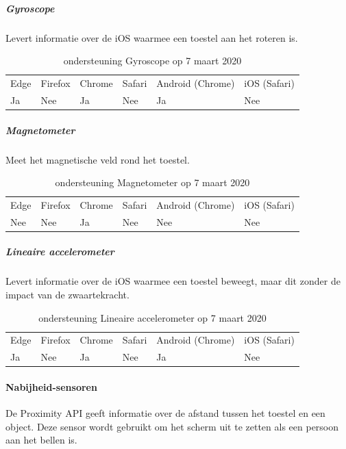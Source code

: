 			
			
		\subparagraph{Gyroscope  }
			Levert informatie over de iOS waarmee een toestel aan het roteren is. 
				
			\begin{table}[H]
				\centering
				\begin{tabular}{llllll}
					Edge & Firefox & Chrome & Safari & Android (Chrome) & iOS (Safari) \\
					Ja   & Nee      &  Ja   & Nee     & Ja               & Nee          
				\end{tabular}	
				\caption{ondersteuning Gyroscope op 7 maart 2020 }
			\end{table}
				
		\subparagraph{Magnetometer }
				Meet het magnetische veld rond het toestel. 
				
			\begin{table}[H]
				\centering
				\begin{tabular}{llllll}
					Edge & Firefox & Chrome & Safari & Android (Chrome) & iOS (Safari) \\
					Nee   & Nee      &  Ja   & Nee     & Nee               & Nee          
				\end{tabular}	
				\caption{ondersteuning Magnetometer op 7 maart 2020 }
			\end{table}
				
				
		\subparagraph{Lineaire accelerometer}
			Levert informatie over de iOS waarmee een toestel beweegt, maar dit zonder de impact van de zwaartekracht.
				
			\begin{table}[H]
				\centering
				\begin{tabular}{llllll}
					Edge & Firefox & Chrome & Safari & Android (Chrome) & iOS (Safari) \\
					Ja   & Nee      &  Ja   & Nee     & Ja               & Nee          
				\end{tabular}	
				\caption{ondersteuning Lineaire accelerometer  op 7 maart 2020 }
			\end{table}
			
				
	\paragraph{Nabijheid-sensoren }
	De Proximity API \autocite{Kostiainen2019} geeft informatie over de afstand tussen het toestel en een object. Deze sensor wordt gebruikt om het scherm uit te zetten als een persoon aan het bellen is.
	
